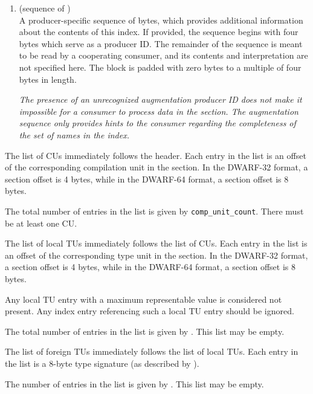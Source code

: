 \begin{enumerate}[1. ]
\item 
\bbeb
\HFNaugmentation{} (sequence of \HFTubyte) \\
\bb
A producer-specific 
sequence of bytes, 
\eb
which provides additional information about the contents of 
this index. If provided, the sequence begins with 
\bb
four bytes which serve as a producer ID.
\eb
The remainder of the
\bb
sequence
\eb
is meant to be read by a cooperating consumer, and its
contents and interpretation are not specified here. The
\bb
block is padded with zero bytes 
\eb
to a multiple of four bytes in length.

\textit{The presence of an unrecognized augmentation 
\bb
producer ID
\eb 
does not make it
impossible for a consumer to process data in the \dotdebugnames{} section.
The augmentation 
\db
sequence only provides hints to the consumer regarding
the completeness of the set of names in the index.}

\end{enumerate}

The list of CUs immediately follows the header. Each entry in the 
list is an offset of the corresponding compilation unit
in the \dotdebuginfo{} section.
In the DWARF-32 format, a section offset is 4 bytes, 
while in the DWARF-64 format, a section offset is 8 bytes.

The total number of entries in the list is given by \texttt{comp\_unit\_count}.
There must be at least one CU.

The list of local TUs immediately follows the list of CUs. Each 
entry in the list is an offset of the corresponding type unit
in the \dotdebuginfo{} section. 
In the DWARF-32 format, a section offset is 4 bytes, 
while in the DWARF-64 format, a section offset is 8 bytes.

\bb
Any local TU entry with a maximum representable value is 
considered not present. Any index entry referencing such 
a local TU entry should be ignored.
\eb

The total number of entries in the list is given by
\HFNlocaltypeunitcount{}. This list may be empty.

The list of foreign TUs immediately follows the list of local TUs.
Each entry in the list is a 8-byte type signature (as described by
\DWFORMrefsigeight).

The number of entries in the list is given by \HFNforeigntypeunitcount{}.
This list may be empty.

